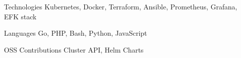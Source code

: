 


\begin{cvskills}


\cvskill
{Technologies} %
{Kubernetes, Docker, Terraform, Ansible, Prometheus, Grafana, EFK stack} %


\cvskill
{Languages} %
{Go, PHP, Bash, Python, JavaScript}


\cvskill
{OSS Contributions} %
{Cluster API, Helm Charts}


\end{cvskills}
